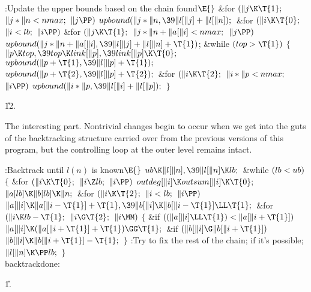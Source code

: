 \Y\B\4:Update the upper bounds based on the chain found\X${}\E{}$\6
\&{for} ${}(\|j\K\T{1};{}$ ${}\|j*\|n<\\{nmax};{}$ ${}\|j\PP){}$\1\5
${}\\{upbound}(\|j*\|n,\39\|l[\|j]+\|l[\|n]);{}$\2\6
\&{for} ${}(\|i\K\T{0};{}$ ${}\|i<\\{lb};{}$ ${}\|i\PP){}$\1\6
\&{for} ${}(\|j\K\T{1};{}$ ${}\|j*\|n+\|a[\|i]<\\{nmax};{}$ ${}\|j\PP){}$\1\5
${}\\{upbound}(\|j*\|n+\|a[\|i],\39\|l[\|j]+\|l[\|n]+\T{1}){}$;\2\2\6
\&{while} ${}(\\{top}>\T{1}){}$\5
${}\{{}$\1\6
${}\|p\K\\{top},\39\\{top}\K\\{link}[\|p],\39\\{link}[\|p]\K\T{0};{}$\6
${}\\{upbound}(\|p+\T{1},\39\|l[\|p]+\T{1});{}$\6
${}\\{upbound}(\|p+\T{2},\39\|l[\|p]+\T{2});{}$\6
\&{for} ${}(\|i\K\T{2};{}$ ${}\|i*\|p<\\{nmax};{}$ ${}\|i\PP){}$\1\5
${}\\{upbound}(\|i*\|p,\39\|l[\|i]+\|l[\|p]);{}$\2\6
\4${}\}{}$\2\par
\U12.\fi

The interesting part.
Nontrivial changes begin to occur when we get into the guts of
the backtracking structure carried over from the previous versions of this
program, but the controlling loop at the outer level remains intact.

\Y\B\4:Backtrack until $l(n)$ is known\X${}\E{}$\6
$\\{ub}\K\|l[\|n],\39\|l[\|n]\K\\{lb};{}$\6
\&{while} ${}(\\{lb}<\\{ub}){}$\5
${}\{{}$\1\6
\&{for} ${}(\|i\K\T{0};{}$ ${}\|i\Z\\{lb};{}$ ${}\|i\PP){}$\1\5
${}\\{outdeg}[\|i]\K\\{outsum}[\|i]\K\T{0};{}$\2\6
${}\|a[\\{lb}]\K\|b[\\{lb}]\K\|n;{}$\6
\&{for} ${}(\|i\K\T{2};{}$ ${}\|i<\\{lb};{}$ ${}\|i\PP){}$\1\5
${}\|a[\|i]\K\|a[\|i-\T{1}]+\T{1},\39\|b[\|i]\K\|b[\|i-\T{1}]\LL\T{1};{}$\2\6
\&{for} ${}(\|i\K\\{lb}-\T{1};{}$ ${}\|i\G\T{2};{}$ ${}\|i\MM){}$\5
${}\{{}$\1\6
\&{if} ${}((\|a[\|i]\LL\T{1})<\|a[\|i+\T{1}]){}$\1\5
${}\|a[\|i]\K(\|a[\|i+\T{1}]+\T{1})\GG\T{1};{}$\2\6
\&{if} ${}(\|b[\|i]\G\|b[\|i+\T{1}]){}$\1\5
${}\|b[\|i]\K\|b[\|i+\T{1}]-\T{1};{}$\2\6
\4${}\}{}$\2\6
:Try to fix the rest of the chain;  if it's
possible\X;\6
${}\|l[\|n]\K\PP\\{lb};{}$\6
\4${}\}{}$\2\6
\\{backtrackdone}:\par
\U1.\fi

